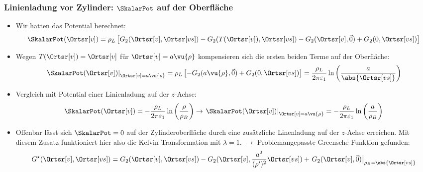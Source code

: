     \begin{frame}
\frametitle{Linienladung vor Zylinder: $\SkalarPot$ auf der Oberfläche}
\begin{itemize}[<+->]
\item Wir hatten das Potential berechnet:
  \begin{equation*}
    \SkalarPot(\Ortsr[v]) = \rho_L \left[ G_2(\Ortsr[v], \Ortsr[vs]) - G_2(T(\Ortsr[v]), \Ortsr[vs]) - G_2(\Ortsr[v], \vec{0}) + G_2(0, \Ortsr[vs])\right]
  \end{equation*}
\item Wegen $T(\Ortsr[v])=\Ortsr[v]$ für $\Ortsr[v] =a\vu{\rho} $ kompensieren sich die ersten beiden Terme auf der Oberfläche:
  \begin{equation*}
    \left.\SkalarPot(\Ortsr[v])\right|_{\Ortsr[v] =a\vu{\rho}} = \rho_L \left[ - G_2(a\vu{\rho}, \vec{0}) + G_2(0, \Ortsr[vs])\right] = \frac{\rho_L}{2\pi\varepsilon_1} \ln\left(\frac{a}{\abs{\Ortsr[vs]}} \right) 
  \end{equation*}
\item Vergleich mit Potential einer Linienladung auf der $z$-Achse:
  \begin{equation*}
      \SkalarPot(\Ortsr[v]) = -\frac{\rho_L}{2\pi\varepsilon_1} \ln\left(\frac{\rho}{\rho_B} \right) \rightarrow \left.\SkalarPot(\Ortsr[v])\right|_{\Ortsr[v] =a\vu{\rho}} = -\frac{\rho_L}{2\pi\varepsilon_1} \ln\left(\frac{a}{\rho_B} \right)
    \end{equation*}
  \item Offenbar lässt sich $\SkalarPot =0$ auf der Zylinderoberfläche durch eine zusätzliche Linenladung auf der $z$-Achse erreichen. Mit diesem Zusatz funktioniert hier also die Kelvin-Transformation mit $\lambda = 1$. $\to$ \alert{Problemangepasste Greensche-Funktion gefunden:}
    \begin{equation*}
      G^\star (\Ortsr[v], \Ortsr[vs]) = G_2(\Ortsr[v], \Ortsr[vs]) - G_2(\Ortsr[v], \frac{a^2}{(\rho^\prime)^2}\Ortsr[vs] )+ \left.G_2(\Ortsr[v], \vec{0})\right|_{\rho_B = \abs{\Ortsr[vs]}}
      \end{equation*}
  \end{itemize}
      \end{frame}



      

